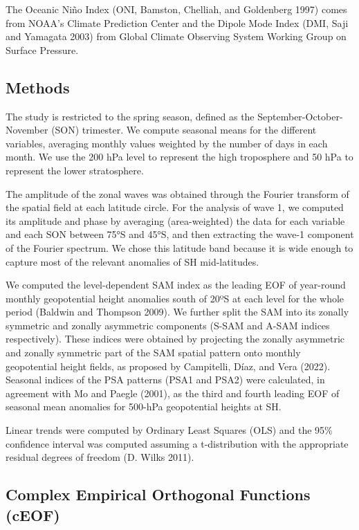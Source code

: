 \documentclass[smallextended]{svjour3}       %
\begin{document}
The Oceanic Niño Index (ONI, Bamston, Chelliah, and Goldenberg 1997) comes from NOAA's Climate Prediction Center and the Dipole Mode Index (DMI, Saji and Yamagata 2003) from Global Climate Observing System Working Group on Surface Pressure.

\hypertarget{methods-1}{%
\subsection{Methods}\label{methods-1}}

The study is restricted to the spring season, defined as the September-October-November (SON) trimester.
We compute seasonal means for the different variables, averaging monthly values weighted by the number of days in each month.
We use the 200 hPa level to represent the high troposphere and 50 hPa to represent the lower stratosphere.

The amplitude of the zonal waves was obtained through the Fourier transform of the spatial field at each latitude circle.
For the analysis of wave 1, we computed its amplitude and phase by averaging (area-weighted) the data for each variable and each SON between 75°S and 45°S, and then extracting the wave-1 component of the Fourier spectrum.
We chose this latitude band because it is wide enough to capture most of the relevant anomalies of SH mid-latitudes.

We computed the level-dependent SAM index as the leading EOF of year-round monthly geopotential height anomalies south of 20ºS at each level for the whole period (Baldwin and Thompson 2009).
We further split the SAM into its zonally symmetric and zonally asymmetric components (S-SAM and A-SAM indices respectively).
These indices were obtained by projecting the zonally asymmetric and zonally symmetric part of the SAM spatial pattern onto monthly geopotential height fields, as proposed by Campitelli, Díaz, and Vera (2022).
Seasonal indices of the PSA patterns (PSA1 and PSA2) were calculated, in agreement with Mo and Paegle (2001), as the third and fourth leading EOF of seasonal mean anomalies for 500-hPa geopotential heights at SH.

Linear trends were computed by Ordinary Least Squares (OLS) and the 95\% confidence interval was computed assuming a t-distribution with the appropriate residual degrees of freedom (D. Wilks 2011).

\hypertarget{complex-empirical-orthogonal-functions-ceof}{%
\subsection{Complex Empirical Orthogonal Functions (cEOF)}\label{complex-empirical-orthogonal-functions-ceof}}
\end{document}
